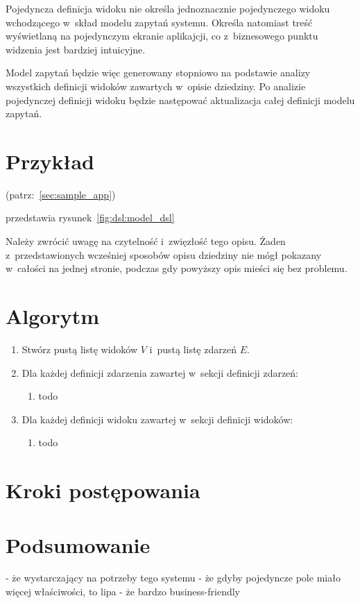 Pojedyncza definicja widoku nie określa jednoznacznie pojedynczego widoku wchodzącego w~skład modelu zapytań systemu.
Określa natomiast treść wyświetlaną na pojedynczym ekranie aplikajcji, co z~biznesowego punktu widzenia jest bardziej intuicyjne.

Model zapytań będzie więc generowany stopniowo na podstawie analizy wszystkich definicji widoków zawartych w~opisie dziedziny.
Po analizie pojedynczej definicji widoku będzie następować aktualizacja całej definicji modelu zapytań.



\section{Przykład}

(patrz:~\ref{sec:sample_app})

przedstawia rysunek~\ref{fig:dsl:model_dsl}


Należy zwrócić uwagę na czytelność i~zwięzłość tego opisu.
Żaden z~przedstawionych wcześniej sposobów opisu dziedziny nie mógł pokazany w~całości na jednej stronie, podczas gdy powyższy opis mieści się bez problemu.



\section{Algorytm}

\begin{enumerate}
 \item Stwórz pustą listę widoków $V$ i~pustą listę zdarzeń $E$.
 \item Dla każdej definicji zdarzenia zawartej w~sekcji definicji zdarzeń:
  \begin{enumerate}
   \item todo
  \end{enumerate}
 \item Dla każdej definicji widoku zawartej w~sekcji definicji widoków:
  \begin{enumerate}
   \item todo
  \end{enumerate}

\end{enumerate}



\section{Kroki postępowania}



\section{Podsumowanie}

- że wystarczający na potrzeby tego systemu
- że gdyby pojedyncze pole miało więcej właściwości, to lipa
- że bardzo business-friendly
